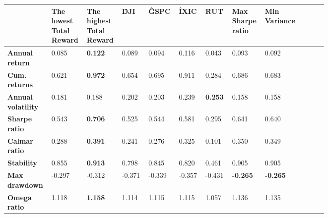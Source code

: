 \documentclass[../xlapes02]{subfiles}
\begin{document}
    \begin{table}
        \centering
        {\footnotesize
            \begin{tabular}{*{10}{|m{0.075\linewidth}|}}
                \toprule
                & \bfseries The lowest Total Reward & \bfseries The highest Total Reward   & \bfseries \^DJI & \bfseries \^GSPC & \bfseries \^IXIC & \bfseries \^RUT & \bfseries Max Sharpe ratio & \bfseries Min Variance \\[0.5cm]
                \midrule
                \bfseries Annual return       & 0.085                             & \color[HTML]{00F000} \bfseries 0.122 & 0.089                                 & 0.094            & 0.116 & 0.043 & 0.093 & 0.092 \\[0.5cm]
                \bfseries Cum. returns        & 0.621                             & \color[HTML]{00F000} \bfseries 0.972 & 0.654                                 & 0.695            & 0.911 & 0.284 & 0.686 & 0.683 \\[0.5cm]
                \bfseries Annual volatility   & 0.181                             & 0.188                                & 0.202                                 & 0.203            & 0.239            & \color[HTML]{00F000} \bfseries 0.253 & 0.158 & 0.158 \\[0.5cm]
                \bfseries Sharpe ratio        & 0.543                             & \color[HTML]{00F000} \bfseries 0.706 & 0.525                                 & 0.544            & 0.581 & 0.295 & 0.641 & 0.640 \\[0.5cm]
                \bfseries Calmar ratio        & 0.288                             & \color[HTML]{00F000} \bfseries 0.391 & 0.241                                 & 0.276            & 0.325 & 0.101 & 0.350 & 0.349 \\[0.5cm]
                \bfseries Stability           & 0.855                             & \color[HTML]{00F000} \bfseries 0.913 & 0.798                                 & 0.845            & 0.820 & 0.461 & 0.905 & 0.905 \\[0.5cm]
                \bfseries Max drawdown        & -0.297                            & -0.312                               & -0.371                                & -0.339           & -0.357           & -0.431                               & \color[HTML]{00F000} \bfseries -0.265 & \color[HTML]{00F000} \bfseries -0.265 \\[0.5cm]
                \bfseries Omega ratio         & 1.118                             & \color[HTML]{00F000} \bfseries 1.158 & 1.114                                 & 1.115            & 1.115 & 1.057 & 1.136 & 1.135 \\[0.5cm]

\end{tabular}}
\end{table}
\end{document}
